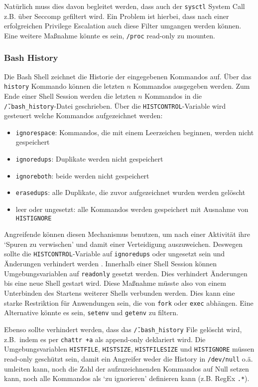 Natürlich muss dies davon begleitet werden, dass auch der \texttt{sysctl} System Call z.B. über Seccomp gefiltert wird. Ein Problem ist hierbei, dass nach einer erfolgreichen Privilege Escalation auch diese Filter umgangen werden können. Eine weitere Maßnahme könnte es sein, \texttt{/proc} read-only zu mounten.

\subsubsection{Bash History}

Die Bash Shell zeichnet die Historie der eingegebenen Kommandos auf. Über das \texttt{history} Kommando können die letzten $n$ Kommandos ausgegeben werden. Zum Ende einer Shell Session werden die letzten $n$ Kommandos in die \texttt{\~/.bash\_history}-Datei geschrieben. Über die \texttt{HISTCONTROL}-Variable wird gesteuert welche Kommandos aufgezeichnet werden:

\begin{itemize}
    \item \texttt{ignorespace}: Kommandos, die mit einem Leerzeichen beginnen, werden nicht gespeichert
    \item \texttt{ignoredups}: Duplikate werden nicht gespeichert
    \item \texttt{ignoreboth}: beide werden nicht gespeichert
    \item \texttt{erasedups}: alle Duplikate, die zuvor aufgezeichnet wurden werden gelöscht
    \item leer oder ungesetzt: alle Kommandos werden gespeichert mit Ausnahme von \texttt{HISTIGNORE}
\end{itemize}

Angreifende können diesen Mechanismus benutzen, um nach einer Aktivität ihre `Spuren zu verwischen' und damit einer Verteidigung auszuweichen. Deswegen sollte die \texttt{HISTCONTROL}-Variable auf \texttt{ignoredups} oder ungesetzt sein und Änderungen verhindert werden \cite{attack-histcontrol}. Innerhalb einer Shell Session können Umgebungsvariablen auf \texttt{readonly} gesetzt werden. Dies verhindert Änderungen bis eine neue Shell gestart wird. Diese Maßnahme müsste also von einem
Unterbinden des Startens weiterer Shells verbunden werden. Dies kann eine starke Restriktion für Anwendungen sein, die von \texttt{fork} oder \texttt{exec} abhängen. Eine Alternative könnte es sein, \texttt{setenv} und \texttt{getenv} zu filtern.

Ebenso sollte verhindert werden, dass das \texttt{\~/.bash\_history} File gelöscht wird, z.B.\ indem es per \texttt{chattr +a} als append-only deklariert wird. Die Umgebungsvariablen \texttt{HISTFILE}, \texttt{HISTSIZE}, \texttt{HISTFILESIZE} und \texttt{HISTIGNORE} müssen read-only geschützt sein, damit ein Angreifer weder die History in \texttt{/dev/null} o.ä. umleiten kann, noch die Zahl der aufzuzeichnenden Kommandos auf Null setzen kann, noch alle Kommandos als `zu
ignorieren' definieren kann (z.B. RegEx \texttt{.*}).

